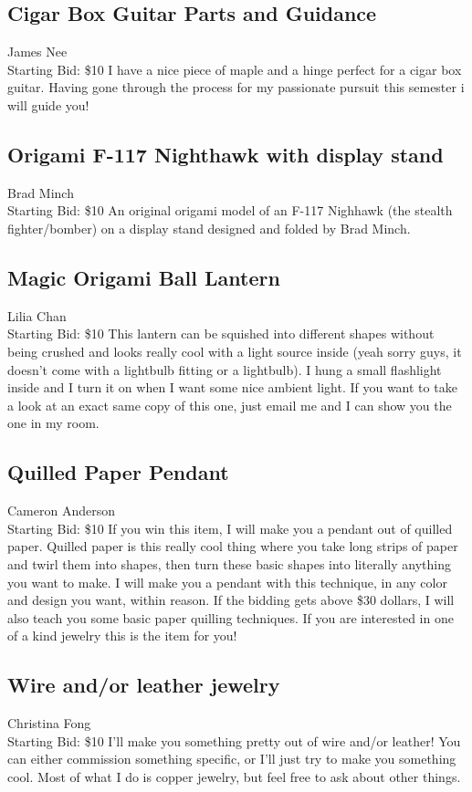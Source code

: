 \documentclass[11pt]{article}
\begin{document}
\subsection{Cigar Box Guitar Parts and Guidance}
James Nee
\\
Starting Bid: \$10
\newline
I have a nice piece of maple and a hinge perfect for a cigar box guitar. Having gone through the process for my passionate pursuit this semester i will guide you!
\subsection{Origami F-117 Nighthawk with display stand}
Brad Minch
\\
Starting Bid: \$10
\newline
An original origami model of an F-117 Nighhawk (the stealth fighter/bomber) on a display stand designed and folded by Brad Minch.
\subsection{Magic Origami Ball Lantern}
Lilia Chan
\\
Starting Bid: \$10
\newline
This lantern can be squished into different shapes without being crushed and looks really cool with a light source inside (yeah sorry guys, it doesn't come with a lightbulb fitting or a lightbulb). I hung a small flashlight inside and I turn it on when I want some nice ambient light. If you want to take a look at an exact same copy of this one, just email me and I can show you the one in my room.
\subsection{Quilled Paper Pendant}
Cameron Anderson
\\
Starting Bid: \$10
\newline
If you win this item, I will make you a pendant out of quilled paper. Quilled paper is this really cool thing where you take long strips of paper and twirl them into shapes, then turn these basic shapes into literally anything you want to make. I will make you a pendant with this technique, in any color and design you want, within reason. If the bidding gets above \$30 dollars, I will also teach you some basic paper quilling techniques. If you are interested in one of a kind jewelry this is the item for you!
\subsection{Wire and/or leather jewelry}
Christina Fong
\\
Starting Bid: \$10
\newline
I'll make you something pretty out of wire and/or leather!  You can either commission something specific, or I'll just try to make you something cool.  Most of what I do is copper jewelry, but feel free to ask about other things. 
\end{document}
